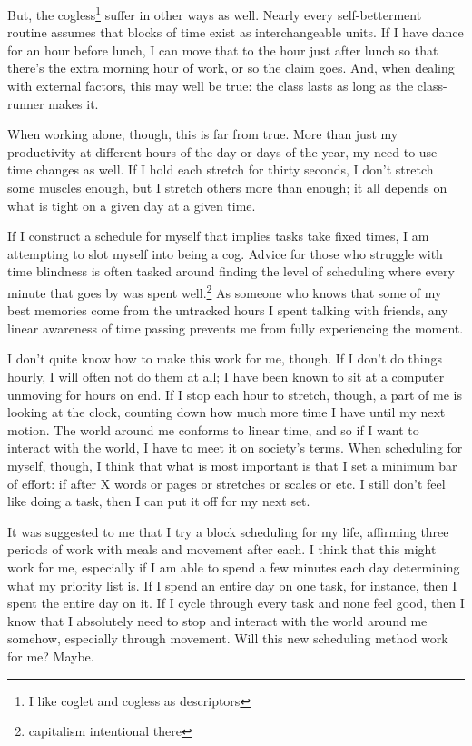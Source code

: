 \documentclass[12pt]{article}
\renewcommand{\,}{\textsuperscript{,}}
\begin{document}
But, the cogless\footnote{I like coglet and cogless as descriptors} suffer in other ways as well.  
Nearly every self-betterment routine assumes that blocks of time exist as interchangeable units.  
If I have dance for an hour before lunch, I can move that to the hour just after lunch so that there's the extra morning hour of work, or so the claim goes.  
And, when dealing with external factors, this may well be true: the class lasts as long as the class-runner makes it.

When working alone, though, this is far from true.  
More than just my productivity at different hours of the day or days of the year, my need to use time changes as well.  
If I hold each stretch for thirty seconds, I don't stretch some muscles enough, but I stretch others more than enough; it all depends on what is tight on a given day at a given time.

If I construct a schedule for myself that implies tasks take fixed times, I am attempting to slot myself into being a cog.  
Advice for those who struggle with time blindness is often tasked around finding the level of scheduling where every minute that goes by was spent well.\footnote{capitalism intentional there}  
As someone who knows that some of my best memories come from the untracked hours I spent talking with friends, any linear awareness of time passing prevents me from fully experiencing the moment.

I don't quite know how to make this work for me, though.  
If I don't do things hourly, I will often not do them at all; I have been known to sit at a computer unmoving for hours on end.  
If I stop each hour to stretch, though, a part of me is looking at the clock, counting down how much more time I have until my next motion.  
The world around me conforms to linear time, and so if I want to interact with the world, I have to meet it on society's terms.  
When scheduling for myself, though, I think that what is most important is that I set a minimum bar of effort: if after X words or pages or stretches or scales or etc. I still don't feel like doing a task, then I can put it off for my next set.

It was suggested to me that I try a block scheduling for my life, affirming three periods of work with meals and movement after each.  
I think that this might work for me, especially if I am able to spend a few minutes each day determining what my priority list is.  
If I spend an entire day on one task, for instance, then I spent the entire day on it.  
If I cycle through every task and none feel good, then I know that I absolutely need to stop and interact with the world around me somehow, especially through movement.  
Will this new scheduling method work for me?  
Maybe.
\end{document}
